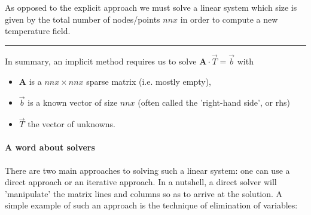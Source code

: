 \begin{center}
\begin{minipage}[t]{0.77\textwidth}
As opposed to the explicit approach we must solve a linear system which size is given 
by the total number of nodes/points $nnx$ in order to compute a new temperature field.

\par\noindent\rule{\textwidth}{0.4pt}
\end{minipage}
\end{center}

\noindent In summary, an implicit method requires us to solve ${\bm A}\cdot\vec{T} = \vec{b}$ with
\begin{itemize}
\item ${\bm A}$ is a $nnx \times nnx$  {\color{olive}sparse} matrix (i.e. mostly empty),
\item ${\vec b}$ is a known vector of size $nnx$ (often called the 'right-hand side', or {\color{olive} rhs})
\item ${\vec T}$ the vector of unknowns.
\end{itemize}

\paragraph{A word about solvers}
There are two main approaches to solving such a linear system: one can use a {\color{olive} direct}
approach or an {\color{olive} iterative} approach. 
In a nutshell, a direct solver will 'manipulate' the matrix lines and columns 
so as to arrive at the solution. A simple example of such an approach is the 
technique of elimination of variables:

